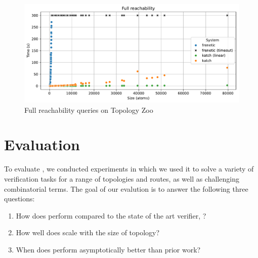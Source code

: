\documentclass[acmsmall,dvipsnames,nonacm]{acmart}
\begin{document}

\begin{figure}
    \includegraphics[scale=0.6]{plots/Full reachability_time_vs_size_wide.pdf}
    \caption{Full reachability queries on Topology Zoo}\label{fig:topology-zoo-full}
\end{figure}

\section{Evaluation}\label{sec:eval}

To evaluate \KATch{}, we conducted experiments in which we used it to
solve a variety of verification tasks for a range of topologies and
routes, as well as challenging combinatorial \NetKAT terms. The goal
of our evalution is to answer the following three questions:

\begin{enumerate}
  \item How does \KATch{} perform compared to the state of the art
    \NetKAT verifier, \Frenetic?
  \item How well does \KATch{} scale with the size of topology?
  \item When does \KATch{} perform asymptotically better than prior work?
\end{enumerate}
\end{document}
